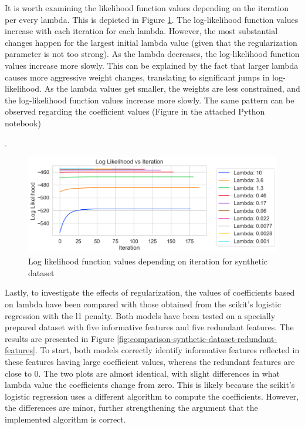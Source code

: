 \documentclass[11pt]{article}
\begin{document}
It is worth examining the likelihood function values depending on the iteration per every lambda. This is depicted in Figure \ref{fig:log-likelihood-synthetic-dataset}. The log-likelihood function values increase with each iteration for each lambda. However, the most substantial changes happen for the largest initial lambda value (given that the regularization parameter is not too strong). As the lambda decreases, the log-likelihood function values increase more slowly. This can be explained by the fact that larger lambda causes more aggressive weight changes, translating to significant jumps in log-likelihood. As the lambda values get smaller, the weights are less constrained, and the log-likelihood function values increase more slowly. The same pattern can be observed regarding the coefficient values (Figure in the attached Python notebook) \par.


\begin{figure}
    \centering
  \includegraphics[width=\textwidth]{../results/log_likelihood_synthetic_dataset.png}
    \caption{Log likelihood function values depending on iteration for synthetic dataset}
    \label{fig:log-likelihood-synthetic-dataset}
\end{figure}


Lastly, to investigate the effects of regularization, the values of coefficients based on lambda have been compared with those obtained from the scikit's logistic regression with the l1 penalty. Both models have been tested on a specially prepared dataset with five informative features and five redundant features. The results are presented in Figure \ref{fig:comparison-synthetic-dataset-redundant-features}. To start, both models correctly identify informative features reflected in these features having large coefficient values, whereas the redundant features are close to 0. The two plots are almost identical, with slight differences in what lambda value the coefficients change from zero. This is likely because the scikit's logistic regression uses a different algorithm to compute the coefficients. However, the differences are minor, further strengthening the argument that the implemented algorithm is correct. \par
\end{document}
